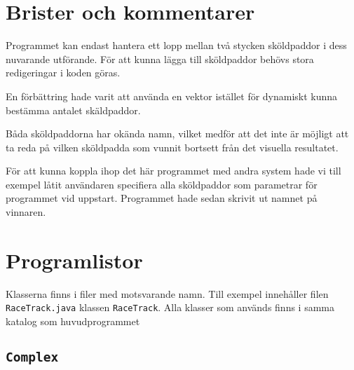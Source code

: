 \documentclass[a4paper]{article}
\newcommand{\code}[1]{\texttt{#1}} %
\begin{document}
\section{Brister och kommentarer}
Programmet kan endast hantera ett lopp mellan två stycken sköldpaddor i dess nuvarande utförande. För att kunna lägga till sköldpaddor behövs stora redigeringar i koden göras.

En förbättring hade varit att använda en vektor istället för dynamiskt kunna bestämma antalet skäldpaddor.

Båda sköldpaddorna har okända namn, vilket medför att det inte är möjligt att ta reda på vilken sköldpadda som vunnit bortsett från det visuella resultatet. 

För att kunna koppla ihop det här programmet med andra system hade vi till exempel låtit användaren specifiera alla sköldpaddor som parametrar för programmet vid uppstart. Programmet hade sedan skrivit ut namnet på vinnaren.


\section{Programlistor}
Klasserna finns i filer med motsvarande namn. Till exempel innehåller filen  \code{RaceTrack.java} klassen \code{RaceTrack}. Alla klasser som används finns i samma katalog som huvudprogrammet

\subsection{\code{Complex}}
\end{document}
